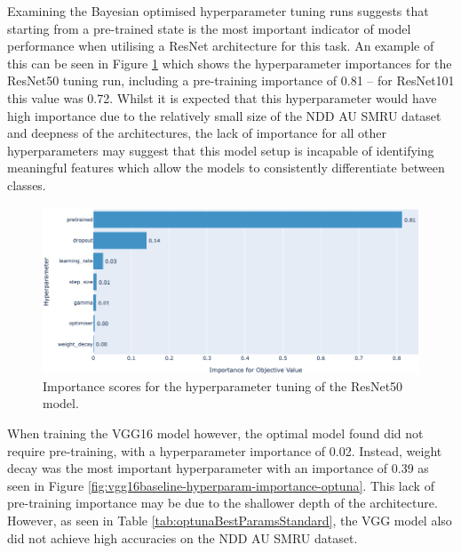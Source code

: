 Examining the Bayesian optimised hyperparameter tuning runs suggests that starting from a pre-trained state is the most important indicator of model performance when utilising a ResNet architecture for this task. An example of this can be seen in Figure \ref{fig:resnet50baseline-hyperparam-importance-optuna} which shows the hyperparameter importances for the ResNet50 tuning run, including a pre-training importance of 0.81 -- for ResNet101 this value was 0.72. Whilst it is expected that this hyperparameter would have high importance due to the relatively small size of the NDD AU SMRU dataset and deepness of the architectures, the lack of importance for all other hyperparameters may suggest that this model setup is incapable of identifying meaningful features which allow the models to consistently differentiate between classes. 

\begin{figure}
	\begin{center}
		\includegraphics[scale=0.4]{Chapter7/figs/resnet50baseline-hyperparam-importance-optuna-updated.png}
	\end{center}
	\caption{Importance scores for the hyperparameter tuning of the ResNet50 model.}
	\label{fig:resnet50baseline-hyperparam-importance-optuna}
\end{figure}

When training the VGG16 model however, the optimal model found did not require pre-training, with a hyperparameter importance of 0.02. Instead, weight decay was the most important hyperparameter with an importance of 0.39 as seen in Figure \ref{fig:vgg16baseline-hyperparam-importance-optuna}. This lack of pre-training importance may be due to the shallower depth of the architecture. However, as seen in Table \ref{tab:optunaBestParamsStandard}, the VGG model also did not achieve high accuracies on the NDD AU SMRU dataset. 

